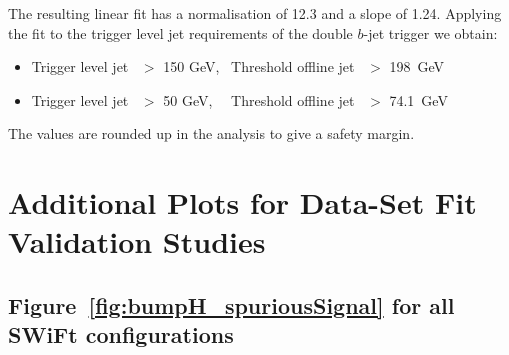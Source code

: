 \noindent
The resulting linear fit has a normalisation of 12.3 and a slope of 1.24.
Applying the fit to the trigger level jet requirements of the double $b$-jet trigger we obtain:
\vspace{-0.5em}
\begin{itemize}[leftmargin=*]
\item Trigger level jet~\pT{} $>$ 150 GeV,~  Threshold offline jet~\pT{} $>$ 198~GeV 
\item Trigger level jet~\pT{} $>$  50 GeV,~~ Threshold offline jet~\pT{} $>$ 74.1~GeV
\end{itemize}
\vspace{-0.3em}
\noindent
The values are rounded up in the analysis to give a safety margin.

\chapter{Additional Plots for \lm{} Data-Set Fit Validation Studies}
\label{app:lowMass_Swift}
\vspace{-3em}

\section{Figure~\ref{fig:bumpH_spuriousSignal} for all SWiFt configurations}

